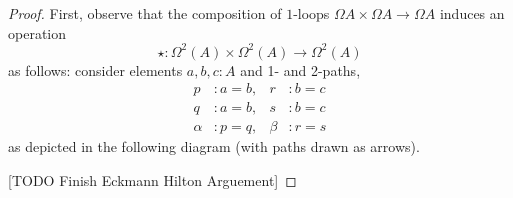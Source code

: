 \documentclass[11pt, a4paper]{article}
\newtheorem{proof}{Proof}
\newcommand{\jdeq}{\equiv}      %
\newcommand{\refl}[1]{\ensuremath{\mathsf{refl}_{#1}}\xspace}
\newcommand{\define}[1]{\textbf{#1}}
\newcommand{\defeq}{\vcentcolon\equiv}  %
\newcommand{\opp}[1]{\mathord{{#1}^{-1}}}
\begin{document}
\begin{proof}
First, observe that the composition of $1$-loops $\Omega A\times \Omega A\to \Omega A$ induces an operation
\[
\star : \Omega^2(A)\times \Omega^2(A)\to \Omega^2(A)
\]
as follows: consider elements $a, b, c : A$ and 1- and 2-paths,
%
\begin{align*}
 p &: a = b,       &       r &: b = c \\
 q &: a = b,       &       s &: b = c \\
 \alpha &: p = q,  &   \beta &: r = s
\end{align*}
%
as depicted in the following diagram (with paths drawn as arrows).

[TODO Finish Eckmann Hilton Arguement]

\end{proof}
\end{document}
